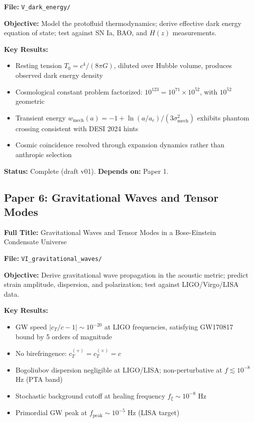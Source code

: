 \documentclass[11pt,a4paper]{article}
\newcommand{\Tzero}{\ensuremath{T_0}}
\begin{document}
\textbf{File:} \texttt{V\_dark\_energy/}

\textbf{Objective:} Model the protofluid thermodynamics; derive effective dark energy equation of state; test against SN Ia, BAO, and $H(z)$ measurements.

\textbf{Key Results:}
\begin{itemize}[leftmargin=*, itemsep=0.1em]
\item Resting tension $\Tzero = c^4/(8\pi G)$, diluted over Hubble volume, produces observed dark energy density
\item Cosmological constant problem factorized: $10^{123} = 10^{71} \times 10^{52}$, with $10^{52}$ geometric
\item Transient energy $w_{\mathrm{mech}}(a) = -1 + \ln(a/a_c)/(3\sigma_{\mathrm{mech}}^2)$ exhibits phantom crossing consistent with DESI 2024 hints
\item Cosmic coincidence resolved through expansion dynamics rather than anthropic selection
\end{itemize}

\textbf{Status:} Complete (draft v01). \quad \textbf{Depends on:} Paper 1.

\subsection{Paper 6: Gravitational Waves and Tensor Modes}
\label{sec:paper6}

\textbf{Full Title:} Gravitational Waves and Tensor Modes in a Bose-Einstein Condensate Universe

\textbf{File:} \texttt{VI\_gravitational\_waves/}

\textbf{Objective:} Derive gravitational wave propagation in the acoustic metric; predict strain amplitude, dispersion, and polarization; test against LIGO/Virgo/LISA data.

\textbf{Key Results:}
\begin{itemize}[leftmargin=*, itemsep=0.1em]
\item GW speed $|c_T/c - 1| \sim 10^{-20}$ at LIGO frequencies, satisfying GW170817 bound by 5 orders of magnitude
\item No birefringence: $c_T^{(+)} = c_T^{(\times)} = c$
\item Bogoliubov dispersion negligible at LIGO/LISA; non-perturbative at $f \lesssim 10^{-8}$ Hz (PTA band)
\item Stochastic background cutoff at healing frequency $f_\xi \sim 10^{-8}$ Hz
\item Primordial GW peak at $f_{\mathrm{peak}} \sim 10^{-5}$ Hz (LISA target)
\end{itemize}
\end{document}
